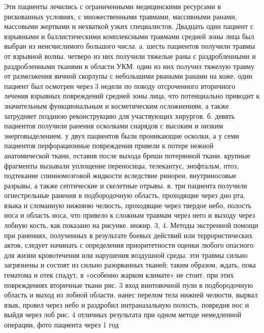 Эти пациенты лечились с ограниченными медицинскими ресурсами в рискованных
условиях, с множественными травмами, массивными ранами, массовыми жертвами и
нехваткой узких специалистов. Двадцать один пациент с взрывными и
баллистическими комплексными травмами средней зоны лица был выбран из
неисчислимого большого числа. а. шесть пациентов получили травмы от взрывной
волны. четверо из них получили тяжелые раны с раздробленными и раздробленными
тканями в области УКМ. один из них получил тяжелую травму от размозжения яичной
скорлупы с небольшими рваными ранами на коже. один пациент был осмотрен через 3
недели по поводу отсроченного вторичного лечения взрывных повреждений средней
зоны лица, что потенциально приводит к значительным функциональным и
косметическим осложнениям, а также затрудняет позднюю реконструкцию для
участвующих хирургов. б. девять пациентов получили ранения осколками снарядов с
высоким и низким энерговыделением. у двух пациентов были проникающие осколки, а
у семи пациентов перфорационные повреждения привели к потере нежной
анатомической ткани, оставив после выхода бреши потерянной ткани. крупные
фрагменты вызывали уплощение переносицы, телекантус, энофтальм, птоз, подтекание
спинномозговой жидкости вследствие ринореи, внутриносовые разрывы, а также
септические и скелетные отрывы. в. три пациента получили огнестрельные ранения в
подбородочную область, проходящие через дно рта, языка и сломанную нижнюю
челюсть, проходящие через твердое небо, полость носа и область носа, что привело
к сложным травмам через него и выходу через лобную кость, как показано на
рисунке. инжир. 3, 4. Методы экстренной помощи при ранениях, полученных в
результате боевых действий или террористических актов, следует начинать с
определения приоритетности оценки любого опасного для жизни кровотечения или
нарушения воздушной среды. эти травмы сильно загрязнены и состоят из сильно
разорванных тканей; таким образом, ждать, пока гематома и отек спадут, в
«особенно жарком климате» не стоит. при этих повреждениях вторичные ткани рис. 3
вход винтовочной пули в подбородочную область и выход из лобной области. нанес
перелом тела нижней челюсти, вырвал язык, провел через небо и раздробил
интраназальную полость, повредив нос и выйдя через лоб рис. 4 отличных
результата при одном методе немедленной операции, фото пациента через 1 год

